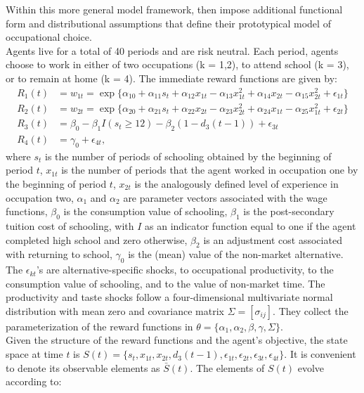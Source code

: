 Within this more general model framework, \citet{Keane.1994} then impose additional functional form and distributional assumptions that define their prototypical model of occupational choice.\\\newline
%
Agents live for a total of 40 periods and are risk neutral. Each period, agents choose to work in either of two occupations (k =  1,2), to attend school (k = 3), or to remain at home (k = 4). The immediate reward functions are given by:
%
\begin{align*}
R_1(t) &= w_{1t} =\exp\{\alpha_{10} + \alpha_{11}s_t + \alpha_{12}x_{1t} - \alpha_{13}x^2_{1t} + \alpha_{14}x_{2t} - \alpha_{15}x^2_{2t} + \epsilon_{1t}\}\\
R_2(t) &= w_{2t} =\exp\{\alpha_{20} + \alpha_{21}s_t + \alpha_{22}x_{2t} - \alpha_{23}x^2_{2t} + \alpha_{24}x_{1t} - \alpha_{25}x^2_{1t} + \epsilon_{2t}\}\\
R_3(t) &= \beta_0 - \beta_1 I(s_t \geq 12) - \beta_2(1 - d_3(t -1)) + \epsilon_{3t} \\
R_4(t) &= \gamma_0 + \epsilon_{4t},
\end{align*}
%
where $s_t$ is the number of periods of schooling obtained by the beginning of period $t$, $x_{1t}$ is the number of periods that the agent worked in occupation one by the beginning of period $t$, $x_{2t}$ is the analogously defined level of experience in occupation two, $\alpha_1$ and $\alpha_2$ are parameter vectors associated with the wage functions, $\beta_0$ is the consumption value of schooling, $\beta_1$ is the post-secondary tuition cost of schooling, with $I$ as an indicator function equal to one if the agent completed high school and zero otherwise, $\beta_2$ is an adjustment cost associated with returning to school, $\gamma_0$ is the (mean) value of the non-market alternative. The $\epsilon_{kt}$'s are alternative-specific shocks, to occupational productivity, to the consumption value of schooling, and to the value of non-market time. The productivity and taste shocks follow a four-dimensional multivariate normal distribution with mean zero and covariance matrix $\Sigma = [\sigma_{ij}]$. They collect the parameterization of the reward functions in $\theta = \{\alpha_1, \alpha_2, \beta, \gamma, \Sigma\}$.\\\newline
%
Given the structure of the reward functions and the agent's objective, the state space at time $t$ is $S(t) = \{s_t,x_{1t},x_{2t}, d_3(t - 1),\epsilon_{1t},\epsilon_{2t},\epsilon_{3t},\epsilon_{4t}\}$. It is convenient to denote its observable elements as $\bar{S}(t)$. The elements of $S(t)$ evolve according to:

